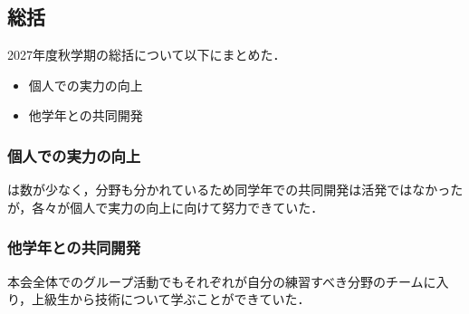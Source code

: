 \subsection*{\secondGrade{}総括}


2027年度秋学期の\secondGrade{}総括について以下にまとめた．

\begin{itemize}
    \item 個人での実力の向上
    \item 他学年との共同開発
\end{itemize}

\subsubsection*{個人での実力の向上}
\secondGrade{}は数が少なく，分野も分かれているため同学年での共同開発は活発ではなかったが，各々が個人で実力の向上に向けて努力できていた．

\subsubsection*{他学年との共同開発}
本会全体でのグループ活動でもそれぞれが自分の練習すべき分野のチームに入り，上級生から技術について学ぶことができていた．
